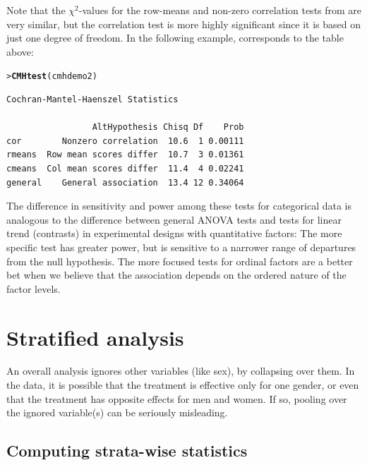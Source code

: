 \documentclass[10pt,krantz2]{krantz}\usepackage[]{graphicx}\usepackage[]{color}
\makeatletter
\newcommand{\hlstd}[1]{\textcolor[rgb]{0.345,0.345,0.345}{#1}}%
\newcommand{\hlkwd}[1]{\textcolor[rgb]{0.737,0.353,0.396}{\textbf{#1}}}%
\newenvironment{kframe}{%
 \def\at@end@of@kframe{}%
 \ifinner\ifhmode%
  \def\at@end@of@kframe{\end{minipage}}%
  \begin{minipage}{\columnwidth}%
 \fi\fi%
 \def\FrameCommand##1{\hskip\@totalleftmargin \hskip-\fboxsep
 \colorbox{shadecolor}{##1}\hskip-\fboxsep
     \hskip-\linewidth \hskip-\@totalleftmargin \hskip\columnwidth}%
 \MakeFramed {\advance\hsize-\width
   \@totalleftmargin\z@ \linewidth\hsize
   \@setminipage}}%
 {\par\unskip\endMakeFramed%
 \at@end@of@kframe}
\newenvironment{knitrout}{}{} %
\renewenvironment{knitrout}{\small\renewcommand{\baselinestretch}{.85}}{} %
\makeatother
\begin{document}


Note that the \(\chi^2\)-values for the row-means and non-zero
correlation tests from 
are very similar, but the correlation test is more
highly significant since it is based on just one degree of
freedom. In the following example,  corresponds to the
table above:
\begin{knitrout}
\color{fgcolor}\begin{kframe}
\begin{alltt}
\hlstd{> }\hlkwd{CMHtest}\hlstd{(cmhdemo2)}
\end{alltt}
\begin{verbatim}
Cochran-Mantel-Haenszel Statistics 

                 AltHypothesis Chisq Df    Prob
cor        Nonzero correlation  10.6  1 0.00111
rmeans  Row mean scores differ  10.7  3 0.01361
cmeans  Col mean scores differ  11.4  4 0.02241
general    General association  13.4 12 0.34064
\end{verbatim}
\end{kframe}
\end{knitrout}
The difference in sensitivity and power among these tests
for categorical data is
analogous to the difference between general ANOVA tests and tests for
linear trend (contrasts)
in experimental designs with quantitative factors:
The more specific test has greater power, but is sensitive to
a narrower range of departures from the null hypothesis.
The more focused tests for ordinal factors are a better bet
when we believe that the association depends on the ordered
nature of the factor levels.

\section{Stratified analysis}\label{sec:twoway-strat}
An overall analysis ignores other variables (like sex), by
collapsing over them.  In the  data,
it is possible that the treatment is effective
only for one gender, or even that the treatment has opposite effects
for men and women.  If so, pooling over the ignored variable(s)
can be seriously misleading.

\subsection{Computing strata-wise statistics}\label{sec:twoway-strata}
\end{document}
